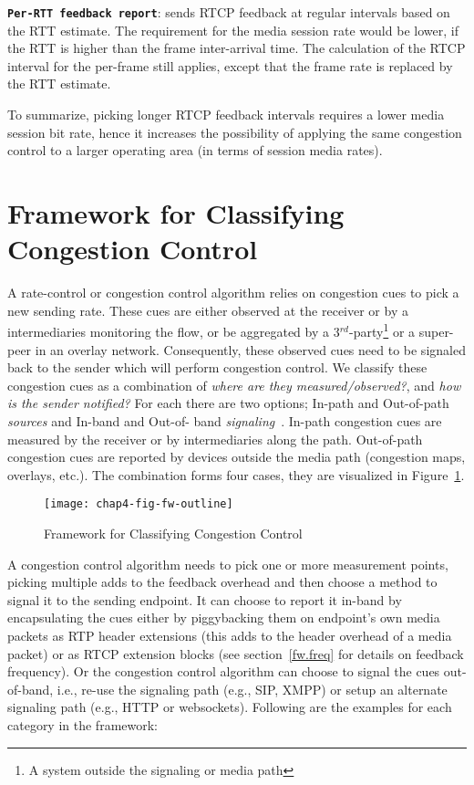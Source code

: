 \textbf{\texttt{Per-RTT feedback report}}: sends RTCP feedback at regular
intervals based on the RTT estimate. The requirement for the media session
rate would be lower, if the RTT is higher than the frame inter-arrival time.
The calculation of the RTCP interval for the per-frame still applies, except
that the frame rate is replaced by the RTT estimate.

To summarize, picking longer RTCP feedback intervals requires a lower media
session bit rate, hence it increases the possibility of applying the same
congestion control to a larger operating area (in terms of session media
rates).

\section{Framework for Classifying Congestion Control}
\label{fw.fw}

A rate-control or congestion control algorithm relies on congestion cues to
pick a new sending rate. These cues are either observed at the receiver or by
a intermediaries monitoring the flow, or be aggregated by a
3$^{rd}$-party\footnote{A system outside the signaling or media path} or a
super-peer in an overlay network. Consequently, these observed cues need to be
signaled back to the sender which will perform congestion control. We classify
these congestion cues as a combination of \emph{where are they
measured/observed?}, and \emph{how is the sender notified?} For each there are
two options; In-path and Out-of-path \emph{sources} and In-band and Out-of-%
band \emph{signaling}~\cite{Singh:PhDFw}. In-path congestion cues are measured
by the receiver or by intermediaries along the path. Out-of-path congestion
cues are reported by devices outside the media path (congestion maps,
overlays, etc.). The combination forms four cases, they are visualized in
Figure~\ref{fig:4:fw}.

\begin{figure}
\texttt{[image: chap4-fig-fw-outline]}
\caption{Framework for Classifying Congestion Control~\cite{Singh:PhDFw}}
\label{fig:4:fw}
\end{figure}

A congestion control algorithm needs to pick one or more measurement points,
picking multiple adds to the feedback overhead and then choose a method to
signal it to the sending endpoint. It can choose to report it in-band by
encapsulating the cues either by piggybacking them on endpoint's own media
packets as RTP header extensions (this adds to the header overhead of a media
packet) or as RTCP extension blocks (see section~\ref{fw.freq} for details on
feedback frequency). Or the congestion control algorithm can choose to signal
the cues out-of-band, i.e., re-use the signaling path (e.g., SIP, XMPP) or
setup an alternate signaling path (e.g., HTTP or websockets). Following are
the examples for each category in the framework:

